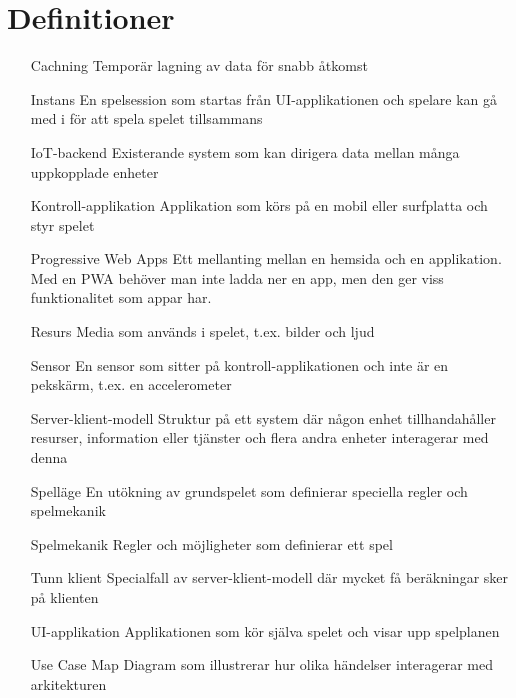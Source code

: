 \section{Definitioner}
\begin{itemize}[leftmargin=3cm]
  \item [Cachning] Temporär lagning av data för snabb åtkomst
  \item [Instans] En spelsession som startas från UI-applikationen och spelare kan gå med i för att spela spelet tillsammans
  \item [IoT-backend] Existerande system som kan dirigera data mellan många uppkopplade enheter
  \item [Kontroll-applikation] Applikation som körs på en mobil eller surfplatta och styr spelet
  \item [Progressive Web Apps] Ett mellanting mellan en hemsida och en applikation. Med en PWA behöver man inte ladda ner en app, men den ger viss funktionalitet som appar har. \cite{bib-pwa}
  \item [Resurs] Media som används i spelet, t.ex. bilder och ljud
  \item [Sensor] En sensor som sitter på kontroll-applikationen och inte är en pekskärm, t.ex. en accelerometer
  \item [Server-klient-modell] Struktur på ett system där någon enhet tillhandahåller resurser, information eller tjänster och flera andra enheter interagerar med denna
  \item [Spelläge] En utökning av grundspelet som definierar speciella regler och spelmekanik
  \item [Spelmekanik] Regler och möjligheter som definierar ett spel
  \item [Tunn klient] Specialfall av server-klient-modell där mycket få beräkningar sker på klienten
  \item [UI-applikation] Applikationen som kör själva spelet och visar upp spelplanen
  \item [Use Case Map] Diagram som illustrerar hur olika händelser interagerar med arkitekturen \cite[p.~30--33]{bib-architecture-primer}
\end{itemize}
